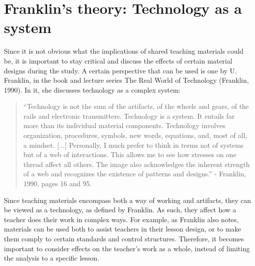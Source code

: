\section{Franklin's theory: Technology as a system}
Since it is not obvious what the implications of shared teaching materials could be, it is important to stay critical and discuss the effects of certain material designs during the study. A certain perspective that can be used is one by U. Franklin, in the book and lecture series The Real World of Technology (Franklin, 1990). In it, she discusses technology as a complex system:

\begin{quote}
“Technology is not the sum of the artifacts, of the wheels and gears, of the rails and electronic transmitters. Technology is a system. It entails far more than its individual material components. Technology involves organization, procedures, symbols, new words, equations, and, most of all, a mindset. [...] Personally, I much prefer to think in terms not of systems but of a web of interactions. This allows me to see how stresses on one thread affect all others. The image also acknowledges the inherent strength of a web and recognizes the existence of patterns and designs.” - Franklin, 1990, pages 16 and 95.
\end{quote}

Since teaching materials encompass both a way of working and artifacts, they can be viewed as a technology, as defined by Franklin. As such, they affect how a teacher does their work in complex ways. For example, as Franklin also notes, materials can be used both to assist teachers in their lesson design, or to make them comply to certain standards and control structures. Therefore, it becomes important to consider effects on the teacher's work as a whole, instead of limiting the analysis to a specific lesson.

 %

